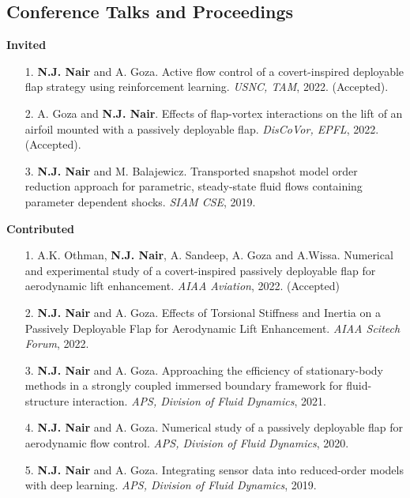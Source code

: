 \documentclass[margin]{res}
\begin{document}
\begin{resume}
\section{\large Conference Talks and Proceedings}

\textbf{Invited}

\begin{itemize} 
	
 \item[1.] \textbf{N.J. Nair} and A. Goza. Active flow control of a covert-inspired deployable flap strategy using reinforcement learning. \textit{USNC, TAM}, 2022. (Accepted).
 
 \item[2.] A. Goza and \textbf{N.J. Nair}. Effects of flap-vortex interactions on the lift of an airfoil mounted with a passively deployable flap. \textit{DisCoVor, EPFL}, 2022. (Accepted).
 
 \item[3.] \textbf{N.J. Nair} and M. Balajewicz. Transported snapshot model order reduction approach for parametric, steady-state fluid flows containing parameter dependent shocks. \textit{SIAM CSE}, 2019.
 
\end{itemize}


\newpage
\textbf{Contributed} 
\begin{itemize}

 \item[1.] A.K. Othman, \textbf{N.J. Nair}, A. Sandeep, A. Goza and A.Wissa. Numerical and experimental study of a covert-inspired
passively deployable flap for aerodynamic lift enhancement. \textit{AIAA Aviation}, 2022. (Accepted)

 \item[2.] \textbf{N.J. Nair} and A. Goza. Effects of Torsional Stiffness and Inertia on a Passively Deployable Flap for Aerodynamic Lift Enhancement. \textit{AIAA Scitech Forum}, 2022.
 
 \item[3.] \textbf{N.J. Nair} and A. Goza. Approaching the efficiency of stationary-body methods in a strongly coupled immersed boundary framework for fluid-structure interaction. \textit{APS, Division of Fluid Dynamics}, 2021.
	
 \item[4.] \textbf{N.J. Nair} and A. Goza. Numerical study of a passively deployable flap for aerodynamic flow control. \textit{APS, Division of Fluid Dynamics}, 2020.
 
 \item[5.] \textbf{N.J. Nair} and A. Goza. Integrating sensor data into reduced-order models with deep learning. \textit{APS, Division of Fluid Dynamics}, 2019.


\end{itemize}
\end{resume}
\end{document}
